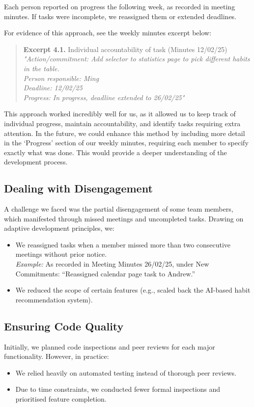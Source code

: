 Each person reported on progress the following week, as recorded in meeting minutes. If tasks were incomplete, we reassigned them or extended deadlines.

For evidence of this approach, see the weekly minutes excerpt below:

\begin{quote}
\textbf{Excerpt 4.1.} Individual accountability of task (Minutes 12/02/25)\\
\textit{"Action/commitment: Add selector to statistics page to pick different habits in the table.\\
Person responsible: Ming\\
Deadline: 12/02/25\\
Progress: In progress, deadline extended to 26/02/25"}
\end{quote}

This approach worked incredibly well for us, as it allowed us to keep track of individual progress, maintain accountability, and identify tasks requiring extra attention. In the future, we could enhance this method by including more detail in the ‘Progress’ section of our weekly minutes, requiring each member to specify exactly what was done. This would provide a deeper understanding of the development process.

\subsection{Dealing with Disengagement}
A challenge we faced was the partial disengagement of some team members, which manifested through missed meetings and uncompleted tasks. Drawing on adaptive development principles, we:
\begin{itemize}
    \item We reassigned tasks when a member missed more than two consecutive meetings without prior notice.\\
    \textit{Example:} As recorded in Meeting Minutes 26/02/25, under New Commitments: “Reassigned calendar page task to Andrew.”
    \item We reduced the scope of certain features (e.g., scaled back the AI-based habit recommendation system).
\end{itemize}

\subsection{Ensuring Code Quality}
Initially, we planned code inspections and peer reviews for each major functionality. However, in practice:
\begin{itemize}
    \item We relied heavily on automated testing instead of thorough peer reviews.
    \item Due to time constraints, we conducted fewer formal inspections and prioritised feature completion.
\end{itemize}


